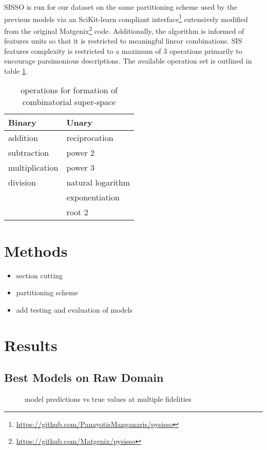 SISSO is run for our dataset on the same partitioning scheme used by the previous models via an SciKit-learn compliant \autocite{buitinck-2013-api} interface\footnote{\url{https://github.com/PanayotisManganaris/pysisso}} extensively modified from the original Matgenix\footnote{\url{https://github.com/Matgenix/pysisso}} code.
Additionally, the algorithm is informed of features units so that it is restricted to meaningful linear combinations.
SIS features complexity is restricted to a maximum of 3 operations primarily to encourage parsimonious descriptions.
The available operation set is outlined in table \ref{tbl:ops}.

\begin{table}[htbp]
\caption{\label{tbl:ops} operations for formation of combinatorial super-space}
\centering
\begin{tabular}{ll}
Binary & Unary\\[0pt]
\hline
addition & reciprocation\\[0pt]
subtraction & power 2\\[0pt]
multiplication & power 3\\[0pt]
division & natural logarithm\\[0pt]
 & exponentiation\\[0pt]
 & root 2\\[0pt]
\end{tabular}
\end{table}

\section{Methods}
\label{sec:org0a0bfb8}
\begin{itemize}
\item section cutting
\item partitioning scheme
\item add testing and evaluation of models
\end{itemize}
\section{Results}
\label{sec:orgaca87e6}
\subsection{Best Models on Raw Domain}
\label{sec:org09fb38b}
 
\begin{figure}[htbp]
\centering

\caption{\label{fig:pairplots} model predictions vs true values at multiple fidelities}
\end{figure}

